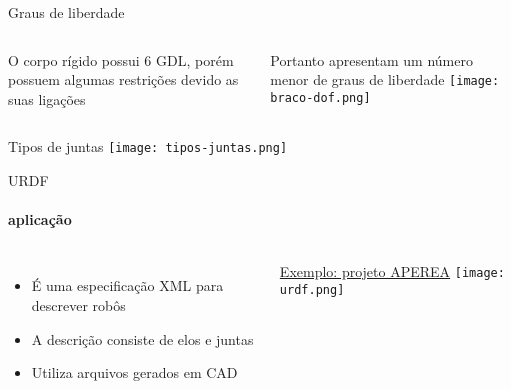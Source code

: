 \begin{frame}[t]{Graus de liberdade}
    \begin{columns}
O corpo rígido possui 6 GDL, porém possuem algumas restrições devido as suas ligações

\vspace*{0.3cm}

Portanto apresentam um número menor de graus de liberdade
            \centering
            \texttt{[image: braco-dof.png]}
    \end{columns}
\end{frame}
\begin{frame}[c]{Tipos de juntas}
    \centering
    \texttt{[image: tipos-juntas.png]}
\end{frame}
\begin{frame}[t]{URDF}
    \framesubtitle{aplicação}
    \begin{columns}
            \begin{itemize}
                \item É uma especificação XML para descrever robôs 
                \item A descrição consiste de elos e juntas   
                \item Utiliza arquivos gerados em CAD
            \end{itemize} 
            \vspace*{0.3cm}
            \href{https://mhar-vell.github.io/rasc/2021-07-21-aperea-simulacao/}{Exemplo: projeto APEREA}
            \centering
            \texttt{[image: urdf.png]}
    \end{columns}
\end{frame}
